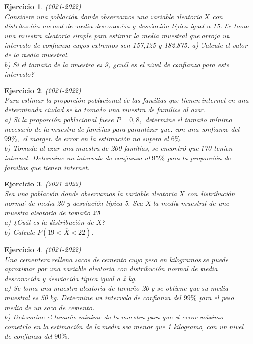 \documentclass[12pt, a4paper]{amsart}
\newtheorem{ejer}{Ejercicio}
\begin{document}
\begin{ejer}\em (2021-2022)\\
Considere una población donde observamos una variable aleatoria $X$ con distribución normal de media desconocida y desviación típica igual a 15. Se toma una muestra aleatoria simple para estimar la media muestral que arroja un intervalo de confianza cuyos extremos son 157,125 y 182,875.
a) Calcule el valor de la media muestral.\\
b) Si el tamaño de la muestra es 9, ¿cuál es el nivel de confianza para este intervalo?
\end{ejer}

\begin{ejer}\em (2021-2022)\\
Para estimar la proporción poblacional de las familias que tienen internet en una determinada ciudad se ha tomado una muestra de familias al azar.\\
a) Si la proporción poblacional fuese $P = 0,8,$ determine el tamaño mínimo necesario de la muestra de familias para garantizar que, con una confianza del $99\%,$ el margen de error en la estimación no supera el $6\%.$\\
b) Tomada al azar una muestra de 200 familias, se encontró que 170 tenían internet. Determine un intervalo de confianza al $95\%$ para la proporción de familias que tienen internet.
\end{ejer}

\begin{ejer}\em (2021-2022)\\
Sea una población donde observamos la variable aleatoria $X$ con distribución normal de media 20 y desviación típica 5. Sea $\overline{X}$ la media muestral de una muestra aleatoria de tamaño 25.\\
a) ¿Cuál es la distribución de $\overline{X}$?\\
b) Calcule $P(19 < \overline{X} < 22).$
\end{ejer}

\begin{ejer}\em (2021-2022)\\
Una cementera rellena sacos de cemento cuyo peso en kilogramos se puede aproximar por una variable aleatoria con distribución normal de media desconocida y desviación típica igual a 2 kg.\\
a) Se toma una muestra aleatoria de tamaño 20 y se obtiene que su media muestral es 50 kg. Determine un intervalo de confianza del $99\%$ para el peso medio de un saco de cemento.\\
b) Determine el tamaño mínimo de la muestra para que el error máximo cometido en la estimación de la media sea menor que 1 kilogramo, con un nivel de confianza del $90\%.$
\end{ejer}
\end{document}
